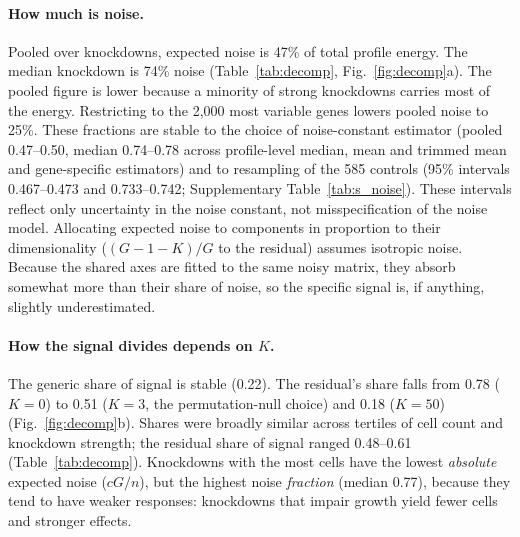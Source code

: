 \documentclass[10pt]{article}
\begin{document}
\paragraph{How much is noise.} Pooled over knockdowns, expected noise is 47\% of total profile energy. The median knockdown is 74\% noise (Table~\ref{tab:decomp}, Fig.~\ref{fig:decomp}a). The pooled figure is lower because a minority of strong knockdowns carries most of the energy. Restricting to the 2{,}000 most variable genes lowers pooled noise to 25\%.
These fractions are stable to the choice of noise-constant estimator (pooled 0.47--0.50, median 0.74--0.78 across profile-level median, mean and trimmed mean and gene-specific estimators) and to resampling of the 585 controls (95\% intervals 0.467--0.473 and 0.733--0.742; Supplementary Table~\ref{tab:s_noise}). These intervals reflect only uncertainty in the noise constant, not misspecification of the noise model.
Allocating expected noise to components in proportion to their dimensionality ($(G-1-K)/G$ to the residual) assumes isotropic noise. Because the shared axes are fitted to the same noisy matrix, they absorb somewhat more than their share of noise, so the specific signal is, if anything, slightly underestimated.

\paragraph{How the signal divides depends on $K$.} The generic share of signal is stable (0.22). The residual's share falls from 0.78 ($K=0$) to 0.51 ($K=3$, the permutation-null choice) and 0.18 ($K=50$) (Fig.~\ref{fig:decomp}b). Shares were broadly similar across tertiles of cell count and knockdown strength; the residual share of signal ranged 0.48--0.61 (Table~\ref{tab:decomp}). Knockdowns with the most cells have the lowest \emph{absolute} expected noise ($cG/n$), but the highest noise \emph{fraction} (median 0.77), because they tend to have weaker responses: knockdowns that impair growth yield fewer cells and stronger effects.
\end{document}
